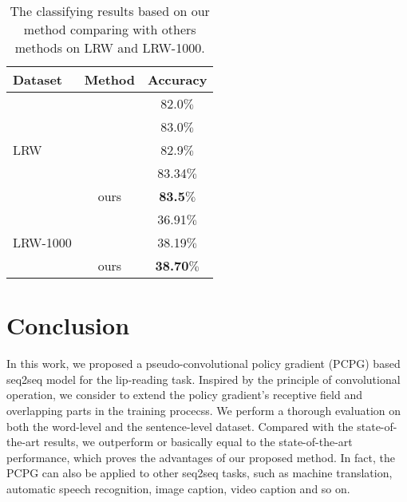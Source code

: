 \documentclass[a4paper, 10pt, conference]{ieeeconf}      %
\begin{document}
	\vspace{-0.4cm}
	\begin{table}[H]
		\caption{The classifying results based on our method comparing with others methods on LRW and LRW-1000. 
			\vspace{-0.2cm}} \label{table6}
		\setlength{\abovecaptionskip}{0.1cm}   %
		\setlength{\belowcaptionskip}{0cm} 
		\centering
		\begin{tabular}{|p{1.39cm}|c|c|}    
			\hline
			Dataset & Method&  Accuracy \\
			\hline
			\hline
			\multirow{5}{*}{LRW}&\cite{Petridis2018}  & 82.0$\%$  \\
			~&\cite{Stafylakis2017} & 83.0$\%$ \\
			~&\cite{Stafylakis2018}&{82.9}$\%$  \\
			~&\cite{Wang2019}&{83.34}$\%$  \\
			~&ours& \textbf{83.5}$\%$  \\
			\hline
			\multirow{3}{*}{LRW-1000}& \cite{Wang2019}& {36.91}$\%$    \\  
			~&	\cite{Yang2019} & 38.19$\%$ \\
			~&ours  & \textbf{38.70}$\%$    \\
			
			\hline
		\end{tabular}
		
	\end{table}
	
	
	\section{Conclusion}
	In this work, we proposed a pseudo-convolutional policy gradient (PCPG) based seq2seq model for the lip-reading task. Inspired by the principle of convolutional operation, we consider to extend the policy gradient's receptive field and overlapping parts in the training procecss. We perform a thorough evaluation on both the word-level and the sentence-level dataset. Compared with the state-of-the-art results, we outperform or basically equal to the state-of-the-art performance, which proves the advantages of our proposed method. In fact, the PCPG can also be applied to other seq2seq tasks, such as machine translation, automatic speech recognition, image caption, video caption and so on. 
	
	
	
\end{document}
